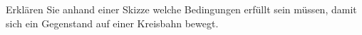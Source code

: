 
\begin{aufgabe}
	Erklären Sie anhand einer Skizze welche Bedingungen erfüllt sein müssen,
	damit sich ein Gegenstand auf einer Kreisbahn bewegt.
\end{aufgabe}
